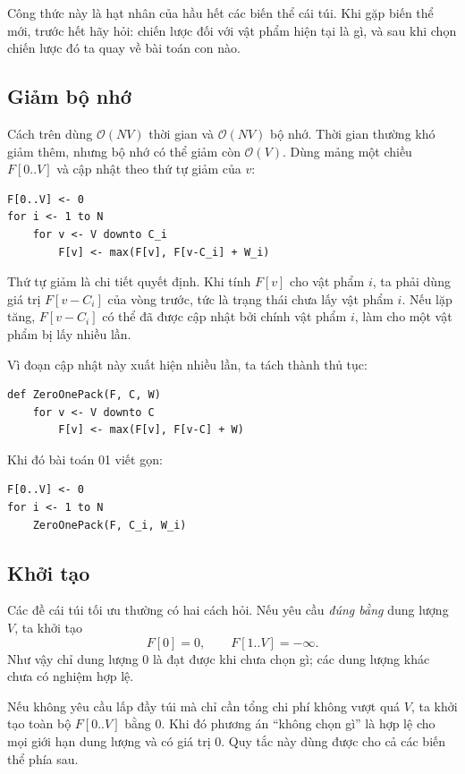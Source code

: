 \documentclass[11pt]{article}
\newcommand{\Oh}{\mathcal{O}}
\begin{document}
Công thức này là hạt nhân của hầu hết các biến thể cái túi. Khi gặp biến thể
mới, trước hết hãy hỏi: chiến lược đối với vật phẩm hiện tại là gì, và sau khi
chọn chiến lược đó ta quay về bài toán con nào.

\subsection{Giảm bộ nhớ}

Cách trên dùng \(\Oh(NV)\) thời gian và \(\Oh(NV)\) bộ nhớ. Thời gian thường
khó giảm thêm, nhưng bộ nhớ có thể giảm còn \(\Oh(V)\). Dùng mảng một chiều
\(F[0..V]\) và cập nhật theo thứ tự giảm của \(v\):
\begin{verbatim}
F[0..V] <- 0
for i <- 1 to N
    for v <- V downto C_i
        F[v] <- max(F[v], F[v-C_i] + W_i)
\end{verbatim}

Thứ tự giảm là chi tiết quyết định. Khi tính \(F[v]\) cho vật phẩm \(i\), ta
phải dùng giá trị \(F[v-C_i]\) của vòng trước, tức là trạng thái chưa lấy vật
phẩm \(i\). Nếu lặp tăng, \(F[v-C_i]\) có thể đã được cập nhật bởi chính vật
phẩm \(i\), làm cho một vật phẩm bị lấy nhiều lần.

Vì đoạn cập nhật này xuất hiện nhiều lần, ta tách thành thủ tục:
\begin{verbatim}
def ZeroOnePack(F, C, W)
    for v <- V downto C
        F[v] <- max(F[v], F[v-C] + W)
\end{verbatim}

Khi đó bài toán 01 viết gọn:
\begin{verbatim}
F[0..V] <- 0
for i <- 1 to N
    ZeroOnePack(F, C_i, W_i)
\end{verbatim}

\subsection{Khởi tạo}

Các đề cái túi tối ưu thường có hai cách hỏi. Nếu yêu cầu \emph{đúng bằng}
dung lượng \(V\), ta khởi tạo
\[
  F[0]=0,\qquad F[1..V]=-\infty.
\]
Như vậy chỉ dung lượng \(0\) là đạt được khi chưa chọn gì; các dung lượng khác
chưa có nghiệm hợp lệ.

Nếu không yêu cầu lấp đầy túi mà chỉ cần tổng chi phí không vượt quá \(V\), ta
khởi tạo toàn bộ \(F[0..V]\) bằng \(0\). Khi đó phương án ``không chọn gì'' là
hợp lệ cho mọi giới hạn dung lượng và có giá trị \(0\). Quy tắc này dùng được
cho cả các biến thể phía sau.
\end{document}
